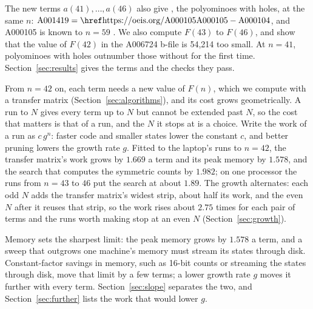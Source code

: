 \documentclass[11pt]{a000104}
\numberwithin{equation}{section}
\begin{document}
The new terms $a(41), \ldots, a(46)$ also give , the polyominoes with holes, at the same $n$: $\text{A001419} = \text{\oeis{A000105}} - \text{A000104}$, and A000105 is known to $n = 59$ \parencite{Shirakawa:2025}.
We also compute $F(43)$ to $F(46)$, and show that the value of $F(42)$ in the A006724 b-file is 54{,}214 too small.
At $n = 41$, polyominoes with holes outnumber those without for the first time.
Section~\ref{sec:results} gives the terms and the checks they pass.

From $n = 42$ on, each term needs a new value of $F(n)$, which we compute with a transfer matrix (Section~\ref{sec:algorithms}), and its cost grows geometrically.
A run to $N$ gives every term up to $N$ but cannot be extended past $N$, so the cost that matters is that of a run, and the $N$ it stops at is a choice.
Write the work of a run as $c\,g^n$: faster code and smaller states lower the constant $c$, and better pruning lowers the growth rate $g$.
Fitted to the laptop's runs to $n = 42$, the transfer matrix's work grows by $1.669$ a term and its peak memory by $1.578$, and the search that computes the symmetric counts by $1.982$; on one processor the runs from $n = 43$ to $46$ put the search at about $1.89$.
The growth alternates: each odd $N$ adds the transfer matrix's widest strip, about half its work, and the even $N$ after it reuses that strip, so the work rises about $2.75$ times for each pair of terms and the runs worth making stop at an even $N$ (Section~\ref{sec:growth}).

Memory sets the sharpest limit: the peak memory grows by $1.578$ a term, and a sweep that outgrows one machine's memory must stream its states through disk.
Constant-factor savings in memory, such as 16-bit counts or streaming the states through disk, move that limit by a few terms; a lower growth rate $g$ moves it further with every term.
Section~\ref{sec:slope} separates the two, and Section~\ref{sec:further} lists the work that would lower $g$.
\end{document}
